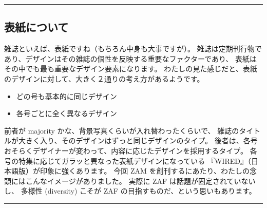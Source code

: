 \documentclass[dvipdfmx,autodetect-engine,10pt,b5paper,papersize,openany,dvipsnames]{jsbook}
\begin{document}
\hrule

\begin{multicols}{2}

\section{表紙について}
雑誌といえば、表紙ですね（もちろん中身も大事ですが）。
雑誌は定期刊行物であり、デザインはその雑誌の個性を反映する重要なファクターであり、
表紙はその中でも最も重要なデザイン要素になります。
わたしの見た感じだと、表紙のデザインに対して、大きく２通りの考え方があるようです。
\begin{itemize}
\item どの号も基本的に同じデザイン
\item 各号ごとに全く異なるデザイン
\end{itemize}
前者が majority かな、背景写真くらいが入れ替わったくらいで、
雑誌のタイトルが大きく入り、そのデザインはずっと同じデザインのタイプ。
後者は、各号おそらくデザイナーが変わって、内容に応じたデザインを採用するタイプ。
各号の特集に応じてガラッと異なった表紙デザインになっている
『WIRED』（日本語版）が印象に強くあります。
今回 ZAM を創刊するにあたり、わたしの念頭にはこんなイメージがありました。
実際に ZAF は話題が固定されていないし、
多様性 (diversity) こそが ZAF の目指すものだ、という思いもあります。

\end{multicols}

\hrule

\vspace{6cm}

\end{document}

